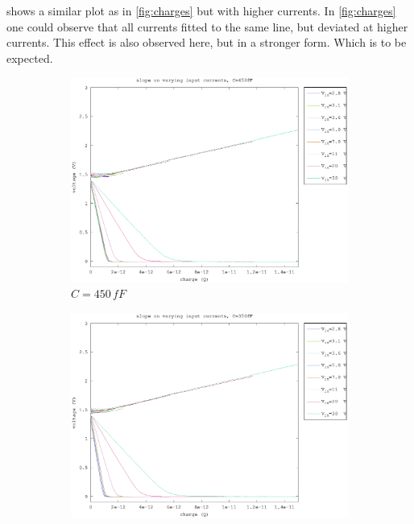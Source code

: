 \documentclass{article}
\begin{document}
 shows a similar plot as in \cref{fig:charges} but with higher currents. In \cref{fig:charges} one could observe that all currents fitted to the same line, but deviated at higher currents. This effect is also observed here, but in a stronger form. Which is to be expected.

\begin{figure}[h]
	\centering
	\begin{subfigure}[b]{0.475\textwidth}
	    \centering
	    \includegraphics[width=\textwidth]{fig/bre_charge_450fF.eps}
	    \caption[Network2]%
	    {$C=450\,fF$}    
	    \label{fig:bre_charges_450fF}
	\end{subfigure}
	\hfill
	\begin{subfigure}[b]{0.475\textwidth}  
	    \centering 
	    \includegraphics[width=\textwidth]{fig/bre_charge_350fF.eps}

\end{subfigure}
\end{figure}
\end{document}
